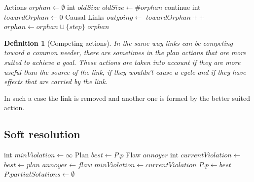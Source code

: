 \documentclass[]{article}
\newtheorem{definition}{Definition}
\begin{document}
\begin{algorithm}\caption{Orphan actions finding algorithm}\label{orphanaction_find}\begin{algorithmic}[1]

 \State Actions
\(orphan \gets \emptyset\) \State int \(oldSize\) \Repeat
        \State \(oldSize \gets \#orphan\)
 
\State continue \EndIf
            \State int \(towardOrphan \gets 0\) \State Causal Links
\(outgoing \gets\) \protect{}
 
\State \(towardOrphan ++\) \EndIf
            \EndFor
\State \(orphan \gets orphan \cup \{step\}\) \EndIf
        \EndFor
     \State \Return \(orphan\)
\EndFunction

\end{algorithmic}\end{algorithm}

\begin{definition}[Competing actions]

In the same way links can be competing toward a common needer, there are
sometimes in the plan actions that are more suited to achieve a goal.
These actions are taken into account if they are more useful than the
source of the link, if they wouldn't cause a cycle and if they have
effects that are carried by the link.

\end{definition}

In such a case the link is removed and another one is formed by the
better suited action.

\subsection{Soft resolution}\label{soft-resolution}

\begin{algorithm}\caption{Soft resolution healing algorithm}\label{softresolution}\begin{algorithmic}[1]

 \State int \(minViolation \gets \infty\)
\State Plan \(best \gets P.p\) \State Flaw \(annoyer\)
 \State int
\(currentViolation \gets\) 
 \State \(best \gets plan\)
\State \(annoyer \gets flaw\)
\State \(minViolation \gets currentViolation\) \EndIf
    \EndFor
    \State \(P.p \gets best\)
\State \(P.partialSolutions \gets \emptyset\)
\State {} \EndFor
\EndFunction

\end{algorithmic}\end{algorithm}
\end{document}
